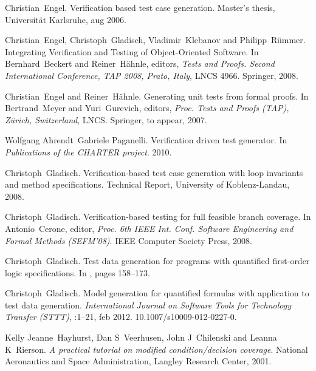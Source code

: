 \documentclass{article}
\newcommand{\tmtextit}[1]{{\itshape{#1}}}
\begin{document}
\begin{thebibliography}{10}
  Christian~Engel.{\newblock} Verification based test
  case generation.{\newblock} Master's thesis, Universit{\"a}t Karlsruhe, aug
  2006.{\newblock}
  
  Christian~Engel, Christoph~Gladisch,
  Vladimir~Klebanov and Philipp~R{\"u}mmer.{\newblock} Integrating
  Verification and Testing of Object-Oriented Software.{\newblock} In
  Bernhard~Beckert and Reiner~H{\"a}hnle, editors, \tmtextit{Tests and Proofs.
  Second International Conference, TAP 2008, Prato, Italy}, LNCS 4966.
  Springer, 2008.{\newblock}
  
  Christian~Engel and
  Reiner~H{\"a}hnle.{\newblock} Generating unit tests from formal
  proofs.{\newblock} In Bertrand~Meyer and Yuri~Gurevich, editors,
  \tmtextit{Proc. Tests and Proofs (TAP), Z{\"u}rich, Switzerland}, LNCS.
  Springer, to appear, 2007.{\newblock}
  
  Wolfgang Ahrendt~Gabriele Paganelli.{\newblock}
  Verification driven test generator.{\newblock} In \tmtextit{Publications of
  the CHARTER project}. 2010.{\newblock}
  
  Christoph~Gladisch.{\newblock}
  Verification-based test case generation with loop invariants and method
  specifications.{\newblock} Technical Report, University of Koblenz-Landau,
  2008.{\newblock}
  
  Christoph~Gladisch.{\newblock} Verification-based
  testing for full feasible branch coverage.{\newblock} In Antonio~Cerone,
  editor, \tmtextit{Proc. 6th IEEE Int. Conf. Software Engineering and Formal
  Methods (SEFM'08)}. IEEE Computer Society Press, 2008.{\newblock}
  
  Christoph~Gladisch.{\newblock} Test data
  generation for programs with quantified first-order logic
  specifications.{\newblock} In {\cite{DBLP:conf/pts/2010}}, pages
  158--173.{\newblock}
  
  Christoph~Gladisch.{\newblock} Model generation
  for quantified formulas with application to test data generation.{\newblock}
  \tmtextit{International Journal on Software Tools for Technology Transfer
  (STTT)}, :1--21, feb 2012.{\newblock} 10.1007/s10009-012-0227-0.{\newblock}
  
  Kelly Jeanne~Hayhurst, Dan S~Veerhusen,
  John J~Chilenski and Leanna K~Rierson.{\newblock} \tmtextit{A practical
  tutorial on modified condition/decision coverage}.{\newblock} National
  Aeronautics and Space Administration, Langley Research Center,
  2001.{\newblock}
  

\end{thebibliography}
\end{document}
